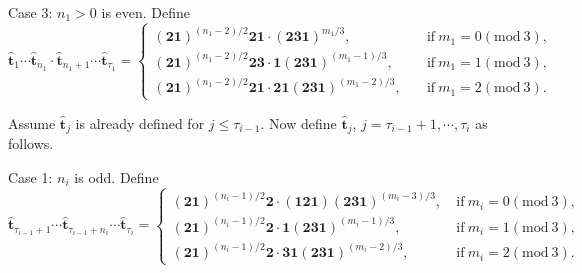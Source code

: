\documentclass[reqno,11pt,graphicx,]{amsart}
\numberwithin{equation}{section}
\theoremstyle{plain}
\newcommand{\3}{\mathbf{3}}
\begin{document}
	{\rm Case 3:} $n_1>0$ is even. Define
	\begin{equation*}
		\hat{\mathbf{t}}_1\cdots \hat{\mathbf{t}}_{n_1}\cdot\hat{\mathbf{t}}_{n_1+1}\cdots\hat{\mathbf{t}}_{\tau_1}=\begin{cases}
			(\mathbf{2}\mathbf{1})^{(n_1-2)/2}	\mathbf{2}\mathbf{1}\cdot(\mathbf{2}\mathbf{3}\mathbf{1})^{m_1/3},\quad &\text{if}\ m_1=0(\text{mod}\ 3),\\
			(\mathbf{2}\mathbf{1})^{(n_1-2)/2}	\mathbf{2}\mathbf{3}\cdot\mathbf{1}(\mathbf{2}\mathbf{3}\mathbf{1})^{(m_1-1)/3},\quad &\text{if}\ m_1=1(\text{mod}\ 3),\\
			(\mathbf{2}\mathbf{1})^{(n_1-2)/2}\mathbf{2}\mathbf{1}	\cdot\mathbf{2}\mathbf{1}(\mathbf{2}\mathbf{3}\mathbf{1})^{(m_1-2)/3},\quad &\text{if}\ m_1=2(\text{mod}\ 3).
		\end{cases}
	\end{equation*}
	
	Assume $\hat{\mathbf{t}}_j$ is already defined for $j\leq\tau_{i-1}$. Now define $\hat{\mathbf{t}}_j$, $j=\tau_{i-1}+1,\cdots,\tau_i$ as follows.
	
	{\rm Case 1:} $n_i$ is odd. Define
	\begin{equation*}\label{type-1}
		\hat{\mathbf{t}}_{\tau_{i-1}+1}\cdots \hat{\mathbf{t}}_{\tau_{i-1}+n_i}\cdots \hat{\mathbf{t}}_{\tau_i}=\begin{cases}
			(\mathbf{2}\mathbf{1})^{(n_i-1)/2}\mathbf{2}\cdot(\mathbf{1}\mathbf{2}\mathbf{1})(\mathbf{2}\mathbf{3}\mathbf{1})^{(m_i-3)/3},\ &\text{if}\ m_i=0(\text{mod}\ 3),\\
			(\mathbf{2}\mathbf{1})^{(n_i-1)/2}\mathbf{2}\cdot\mathbf{1}(\mathbf{2}\mathbf{3}\mathbf{1})^{(m_i-1)/3},\ &\text{if}\ m_i=1(\text{mod}\ 3),\\
			(\mathbf{2}\mathbf{1})^{(n_i-1)/2}\mathbf{2}\cdot\mathbf{3}\mathbf{1}(\mathbf{2}\mathbf{3}\mathbf{1})^{(m_i-2)/3},\ &\text{if}\ m_i=2(\text{mod}\ 3).
		\end{cases}
	\end{equation*}
	
\end{document}
